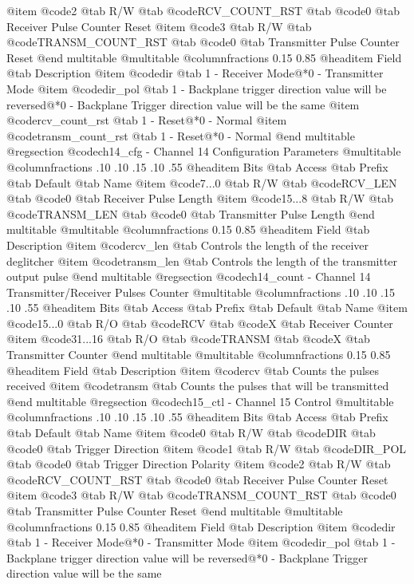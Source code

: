 @item @code{2}
@tab R/W @tab
@code{RCV_COUNT_RST}
@tab @code{0} @tab 
Receiver Pulse Counter Reset
@item @code{3}
@tab R/W @tab
@code{TRANSM_COUNT_RST}
@tab @code{0} @tab 
Transmitter Pulse Counter Reset
@end multitable
@multitable @columnfractions 0.15 0.85
@headitem Field @tab Description
@item @code{dir} @tab 1 - Receiver Mode@*0 - Transmitter Mode
@item @code{dir_pol} @tab 1 - Backplane trigger direction value will be reversed@*0 - Backplane Trigger direction value will be the same
@item @code{rcv_count_rst} @tab 1 - Reset@*0 - Normal
@item @code{transm_count_rst} @tab 1 - Reset@*0 - Normal
@end multitable
@regsection @code{ch14_cfg} - Channel 14 Configuration Parameters
@multitable @columnfractions .10 .10 .15 .10 .55
@headitem Bits @tab Access @tab Prefix @tab Default @tab Name
@item @code{7...0}
@tab R/W @tab
@code{RCV_LEN}
@tab @code{0} @tab 
Receiver Pulse Length
@item @code{15...8}
@tab R/W @tab
@code{TRANSM_LEN}
@tab @code{0} @tab 
Transmitter Pulse Length
@end multitable
@multitable @columnfractions 0.15 0.85
@headitem Field @tab Description
@item @code{rcv_len} @tab Controls the length of the receiver deglitcher
@item @code{transm_len} @tab Controls the length of the transmitter output pulse
@end multitable
@regsection @code{ch14_count} - Channel 14 Transmitter/Receiver Pulses Counter
@multitable @columnfractions .10 .10 .15 .10 .55
@headitem Bits @tab Access @tab Prefix @tab Default @tab Name
@item @code{15...0}
@tab R/O @tab
@code{RCV}
@tab @code{X} @tab 
Receiver Counter
@item @code{31...16}
@tab R/O @tab
@code{TRANSM}
@tab @code{X} @tab 
Transmitter Counter
@end multitable
@multitable @columnfractions 0.15 0.85
@headitem Field @tab Description
@item @code{rcv} @tab Counts the pulses received
@item @code{transm} @tab Counts the pulses that will be transmitted
@end multitable
@regsection @code{ch15_ctl} - Channel 15 Control
@multitable @columnfractions .10 .10 .15 .10 .55
@headitem Bits @tab Access @tab Prefix @tab Default @tab Name
@item @code{0}
@tab R/W @tab
@code{DIR}
@tab @code{0} @tab 
Trigger Direction
@item @code{1}
@tab R/W @tab
@code{DIR_POL}
@tab @code{0} @tab 
Trigger Direction Polarity
@item @code{2}
@tab R/W @tab
@code{RCV_COUNT_RST}
@tab @code{0} @tab 
Receiver Pulse Counter Reset
@item @code{3}
@tab R/W @tab
@code{TRANSM_COUNT_RST}
@tab @code{0} @tab 
Transmitter Pulse Counter Reset
@end multitable
@multitable @columnfractions 0.15 0.85
@headitem Field @tab Description
@item @code{dir} @tab 1 - Receiver Mode@*0 - Transmitter Mode
@item @code{dir_pol} @tab 1 - Backplane trigger direction value will be reversed@*0 - Backplane Trigger direction value will be the same
